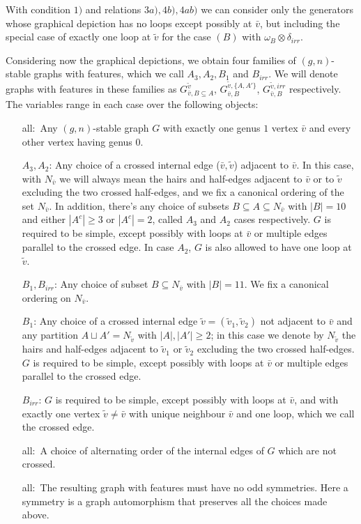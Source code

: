 With condition $1)$ and relations $3a),4b), 4ab)$ we can consider only the generators whose graphical depiction has no loops except possibly at $\bar{v}$, but including the special case of exactly one loop at $\tilde{v}$ for the case $(B)$ with $\omega_B\otimes \delta_{irr}$.

Considering now the graphical depictions, we obtain four families of $(g,n)$-stable graphs with features, which we call $A_3,A_2,B_1$ and $B_{irr}$. We will denote graphs with features in these families as $G_{\bar{v},B\subseteq A}^{\tilde{v}}$, $G_{\bar{v},B}^{\tilde{v},\{A,A'\}}$, $G_{\bar{v},B}^{\tilde{v},irr}$ respectively. The variables range in each case over the following objects:
\begin{enumerate}
    \item[all:\, ] Any $(g,n)$-stable graph $G$ with exactly one genus $1$ vertex $\bar{v}$ and every other vertex having genus $0$.
    \item[$A_3,A_2$: ] Any choice of a crossed internal edge ($\bar{v},\tilde{v}$) adjacent to $\bar{v}$. In this case, with $N_{\bar{v}}$ we will always mean the hairs and half-edges adjacent to $\bar{v}$ or to $\tilde{v}$ excluding the two crossed half-edges, and we fix a canonical ordering of the set $N_{\bar{v}}$. In addition, there's any choice of subsets $B\subseteq A\subseteq N_{\bar{v}}$ with $|B|=10$ and either $|A^c|\geq 3$ or $|A^c|=2$, called $A_3$ and $A_2$ cases respectively. $G$ is required to be simple, except possibly with loops at $\bar{v}$ or multiple edges parallel to the crossed edge. In case $A_2$, $G$ is also allowed to have one loop at $\tilde{v}$.
    \item[$B_1,B_{irr}$: ] Any choice of subset $B\subseteq N_{\bar{v}}$ with $|B|=11$.  We fix a canonical ordering on $N_{\bar{v}}$.
    \item[$B_1$:] Any choice of a crossed internal edge $\tilde{v}=(\tilde{v}_1,\tilde{v}_2)$ not adjacent to $\bar{v}$ and any partition $A\sqcup A'=N_{\tilde{v}}$ with $|A|,|A'|\geq 2$; in this case we denote by $N_{\tilde{v}}$ the hairs and half-edges adjacent to $\tilde{v}_1$ or $\tilde{v}_2$ excluding the two crossed half-edges. $G$ is required to be simple, except possibly with loops at $\bar{v}$ or multiple edges parallel to the crossed edge.
    \item[$B_{irr}$:] $G$ is required to be simple, except possibly with loops at $\bar{v}$, and with exactly one vertex $\tilde{v}\neq\bar{v}$ with unique neighbour $\bar{v}$ and one loop, which we call the crossed edge.
    \item[all:\,] A choice of alternating order of the internal edges of $G$ which are not crossed.
    \item[all:\,] The resulting graph with features must have no odd symmetries. Here a symmetry is a graph automorphism that preserves all the choices made above.
\end{enumerate}

